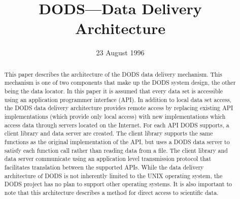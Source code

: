 
%






\title{DODS---Data Delivery Architecture}
\author{}
\date{23 August 1996} %

\maketitle

\begin{abstract}

  This paper describes the architecture of the DODS data delivery mechanism.
  This mechanism is one of two components that make up the DODS system
  design, the other being the data locator. In this paper it is assumed that
  every data set is accessible using an application programmer interface
  (API). In addition to local data set access, the DODS data delivery
  architecture provides remote access by replacing existing API
  implementations (which provide only local access) with new implementations
  which access data through servers located on the Internet. For each API
  DODS supports, a client library and data server are created. The client
  library supports the same functions as the original implementation of the
  API, but uses a DODS data server to satisfy each function call rather than
  reading data from a file. The client library and data server communicate
  using an application level transmission protocol that facilitates
  translation between the supported APIs.  While the data delivery
  architecture of DODS is not inherently limited to the UNIX operating
  system, the DODS project has no plan to support other operating systems. It
  is also important to note that this architecture describes a method for
  direct access to scientific data.

\end{abstract}



\begin{htmlonly}
\end{htmlonly}

\clearpage

\tableofcontents


